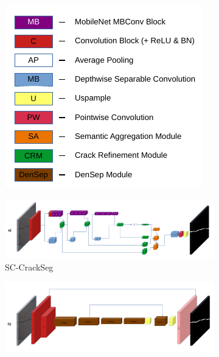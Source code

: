 \documentclass[a4paper,12pt]{report}
\begin{document}
\begin{figure}[t]
    \centering
    \begin{subfigure}[b]{0.3\textwidth}
        \centering
        \includegraphics[width=\textwidth]{res/crack-experiment-diagrams/legend.pdf}
        \label{fig:sc-crackseg-versions-legend}
    \end{subfigure}
    \begin{subfigure}[b]{0.6964\textwidth}
        \centering
        \includegraphics[width=\textwidth]{res/crack-experiment-diagrams/sc-crackseg.pdf}
        \caption{SC-CrackSeg}
        \label{fig:sc-crackseg-versions-sc-crackseg}
    \end{subfigure}
    \begin{subfigure}[b]{0.6964\textwidth}
        \centering
        \includegraphics[width=\textwidth]{res/crack-experiment-diagrams/sddnet.pdf}

\end{subfigure}
\end{figure}
\end{document}
